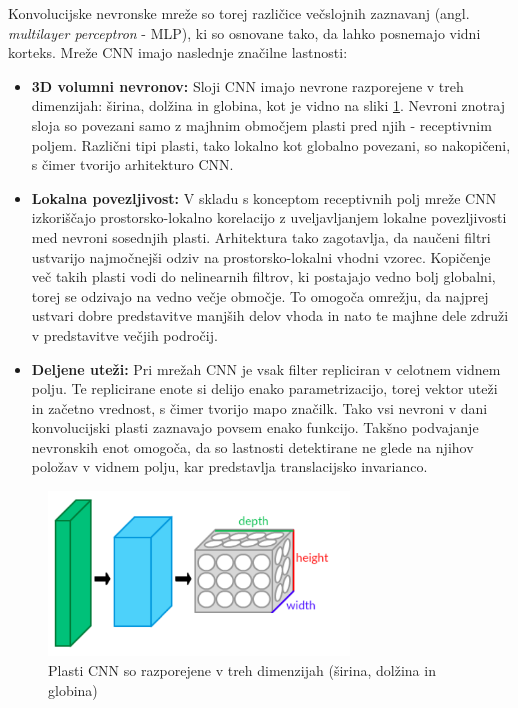 \documentclass[runningheads,a4paper]{llncs}
\begin{document}
Konvolucijske nevronske mreže so torej različice večslojnih zaznavanj (angl. \textit{multilayer perceptron} - MLP), ki so osnovane tako, da lahko posnemajo vidni korteks. Mreže CNN imajo naslednje značilne lastnosti:
\begin{itemize}
\item \textbf{3D volumni nevronov:} Sloji CNN imajo nevrone razporejene v treh dimenzijah: širina, dolžina in globina, kot je vidno na sliki \ref{fig:layersCNN}. Nevroni znotraj sloja so povezani samo z majhnim območjem plasti pred njih - receptivnim poljem. Različni tipi plasti, tako lokalno kot globalno povezani, so nakopičeni, s čimer tvorijo arhitekturo CNN.

\item \textbf{Lokalna povezljivost:} V skladu s konceptom receptivnih polj mreže CNN izkoriščajo prostorsko-lokalno korelacijo z uveljavljanjem lokalne povezljivosti med nevroni sosednjih plasti. Arhitektura tako zagotavlja, da naučeni filtri ustvarijo najmočnejši odziv na prostorsko-lokalni vhodni vzorec. Kopičenje več takih plasti vodi do nelinearnih filtrov, ki postajajo vedno bolj globalni, torej se odzivajo na vedno večje območje. To omogoča omrežju, da najprej ustvari dobre predstavitve manjših delov vhoda in nato te majhne dele združi v predstavitve večjih področij.

\item \textbf{Deljene uteži:} Pri mrežah CNN je vsak filter repliciran v celotnem vidnem polju. Te replicirane enote si delijo enako parametrizacijo, torej vektor uteži in začetno vrednost, s čimer tvorijo mapo značilk. Tako vsi nevroni v dani konvolucijski plasti zaznavajo povsem enako funkcijo. Takšno podvajanje nevronskih enot omogoča, da so lastnosti detektirane ne glede na njihov položav v vidnem polju, kar predstavlja translacijsko invarianco.
\end{itemize}

\begin{figure}[H]
\centering
\includegraphics[width=80mm]{figures/Conv_layers.png}
\caption{Plasti CNN so razporejene v treh dimenzijah (širina, dolžina in globina)}
\label{fig:layersCNN}
\end{figure}
\end{document}
